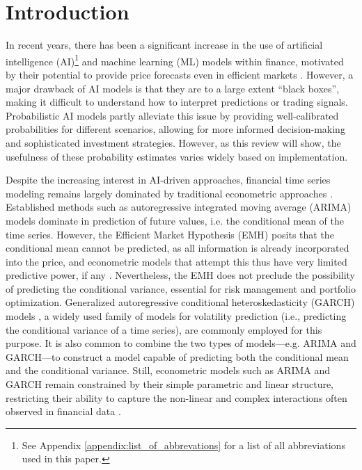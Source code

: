 \setcounter{footnote}{0}

\section{Introduction}
\label{sec:introduction}

In recent years, there has been a significant increase in the use of artificial intelligence (AI)\footnote{See Appendix \ref{appendix:list_of_abbrevations} for a list of all abbreviations used in this paper.} and machine learning (ML) models within finance, motivated by their potential to provide price forecasts even in efficient markets \parencite{sezer2020financial}. However, a major drawback of AI models is that they are to a large extent ``black boxes'', making it difficult to understand how to interpret predictions or trading signals. Probabilistic AI models partly alleviate this issue by providing well-calibrated probabilities for different scenarios, allowing for more informed decision-making and sophisticated investment strategies. However, as this review will show, the usefulness of these probability estimates varies widely based on implementation.

Despite the increasing interest in AI-driven approaches, financial time series modeling remains largely dominated by traditional econometric approaches \parencite{lopez2019beyond_econ}. Established methods such as autoregressive integrated moving average (ARIMA) models \parencite{boxJenkins2016time} dominate in prediction of future values, i.e. the conditional mean of the time series. However, the Efficient Market Hypothesis (EMH) posits that the conditional mean cannot be predicted, as all information is already incorporated into the price, and econometric models that attempt this thus have very limited predictive power, if any \parencite{Campbell2007}. Nevertheless, the EMH does not preclude the possibility of predicting the conditional variance, essential for risk management and portfolio optimization. Generalized autoregressive conditional heteroskedasticity (GARCH) models \parencite{BOLLERSLEV1986GARCH}, a widely used family of models for volatility prediction (i.e., predicting the conditional variance of a time series), are commonly employed for this purpose. It is also common to combine the two types of models—e.g. ARIMA and GARCH—to construct a model capable of predicting both the conditional mean and the conditional variance. Still, econometric models such as ARIMA and GARCH remain constrained by their simple parametric and linear structure, restricting their ability to capture the non-linear and complex interactions often observed in financial data \parencite{sezer2020financial}. 

